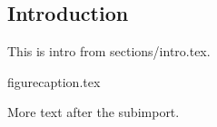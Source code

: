 \subsection{Introduction}

This is intro from sections/intro.tex.

{figurecaption.tex}

More text after the subimport.
